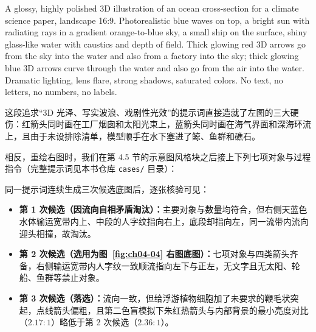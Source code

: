 \begin{Prompt}
A glossy, highly polished 3D illustration of an ocean cross-section for a
climate science paper, landscape 16:9. Photorealistic blue waves on top, a
bright sun with radiating rays in a gradient orange-to-blue sky, a small ship
on the surface, shiny glass-like water with caustics and depth of field.
Thick glowing red 3D arrows go from the sky into the water and also from a
factory into the sky; thick glowing blue 3D arrows curve through the water and
also go from the air into the water. Dramatic lighting, lens flare, strong
shadows, saturated colors. No text, no letters, no numbers, no labels.
\end{Prompt}

这段追求“3D 光泽、写实波浪、戏剧性光效”的提示词直接造就了左图的三大硬伤：红箭头同时画在工厂烟囱和太阳光束上，蓝箭头同时画在海气界面和深海环流上，且由于未设排除清单，模型顺手在水下塞进了鲸、鱼群和礁石。

相反，重绘右图时，我们在第 4.5 节的示意图风格块之后接上下列七项对象与过程指令（完整提示词见本书仓库 \texttt{cases/} 目录）：


同一提示词连续生成三次候选底图后，逐张核验可见：
\begin{itemize}
\item \textbf{第 1 次候选（因流向自相矛盾淘汰）：}主要对象与数量均符合，但右侧天蓝色水体输运宽带内上、中段的人字纹指向右上，底段却指向左，同一流带内流向迎头相撞，故淘汰。
\item \textbf{第 2 次候选（选用为图~\ref{fig:ch04-04} 右图底图）：}七项对象与四类箭头齐备，右侧输运宽带内人字纹一致顺流指向左下与正左，无文字且无太阳、轮船、鱼群等禁止对象。
\item \textbf{第 3 次候选（落选）：}流向一致，但给浮游植物细胞加了未要求的鞭毛状突起，点线箭头偏粗，且第二色盲模拟下朱红热箭头与内部背景的最小亮度对比（$2.17:1$）略低于第 2 次候选（$2.36:1$）。
\end{itemize}

